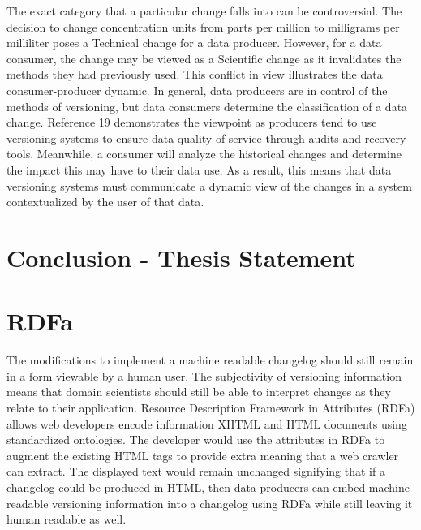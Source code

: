 The exact category that a particular change falls into can be controversial.
The decision to change concentration units from parts per million to milligrams per milliliter poses a Technical change for a data producer.
However, for a data consumer, the change may be viewed as a Scientific change as it invalidates the methods they had previously used.
This conflict in view illustrates the data consumer-producer dynamic.
In general, data producers are in control of the methods of versioning, but data consumers determine the classification of a data change.
Reference 19 demonstrates the viewpoint as producers tend to use versioning systems to ensure data quality of service through audits and recovery tools.
Meanwhile, a consumer will analyze the historical changes and determine the impact this may have to their data use.
As a result, this means that data versioning systems must communicate a dynamic view of the changes in a system contextualized by the user of that data.

\section{Conclusion - Thesis Statement}

\section{RDFa}

The modifications to implement a machine readable changelog should still remain in a form viewable by a human user.
The subjectivity of versioning information means that domain scientists should still be able to interpret changes as they relate to their application.
Resource Description Framework in Attributes (RDFa) allows web developers encode information XHTML and HTML documents using standardized ontologies.
The developer would use the attributes in RDFa to augment the existing HTML tags to provide extra meaning that a web crawler can extract.
The displayed text would remain unchanged signifying that if a changelog could be produced in HTML, then data producers can embed machine readable versioning information into a changelog using RDFa while still leaving it human readable as well.


